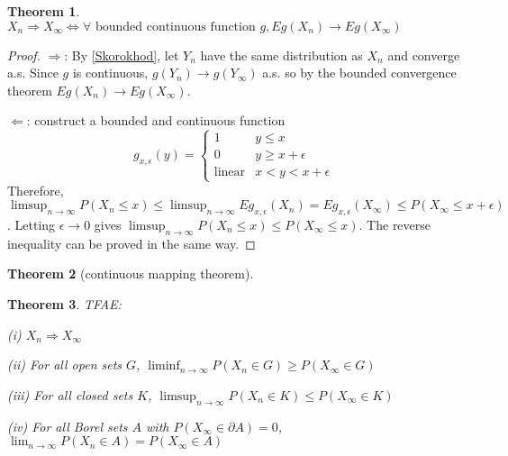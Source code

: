 \documentclass{article}
\newtheorem{Thm}{Theorem}[section]
\theoremstyle{definition}
\begin{document}
\begin{Thm}
$X_n\Longrightarrow X_\infty\Longleftrightarrow\forall\text{ bounded continuous function }g, Eg(X_n)\longrightarrow Eg(X_\infty)$
\end{Thm}
\begin{proof}
$\Longrightarrow$: By \ref{Skorokhod}, let $Y_n$ have the same distribution as $X_n$ and converge a.s. Since $g$ is continuous, $g(Y_n)\longrightarrow g(Y_\infty)$ a.s. so by the bounded convergence theorem $Eg(X_n)\longrightarrow Eg(X_\infty)$.\par
$\Longleftarrow$: construct a bounded and continuous function\[g_{x,\epsilon}(y)=\left\{\begin{matrix}
 1 &y\le x \\
 0 & y\ge x+\epsilon\\
 \text{linear} & x< y< x+\epsilon
\end{matrix}\right.\]
Therefore, $\limsup_{n\to\infty} P(X_n\le x)\le \limsup_{n\to\infty} Eg_{x,\epsilon}(X_n)=Eg_{x,\epsilon}(X_\infty)\le P(X_\infty\le x+\epsilon)$. Letting $\epsilon\to 0$ gives $\limsup_{n\to\infty}P(X_n\le x)\le P(X_\infty\le x)$. The reverse inequality can be proved in the same way.
\end{proof}
\begin{Thm}[continuous mapping theorem]

\end{Thm}

\begin{Thm}
TFAE:\par
(i) $X_n\Longrightarrow X_\infty$\par
(ii) For all open sets $G$, $\liminf_{n\to\infty}P(X_n\in G)\ge P(X_\infty\in G)$\par
(iii) For all closed sets $K$, $\limsup_{n\to\infty}P(X_n\in K)\le P(X_\infty\in K)$\par
(iv) For all Borel sets $A$ with $P(X_\infty\in\partial A)=0$, $\lim_{n\to\infty}P(X_n\in A)=P(X_\infty\in A)$
\end{Thm}
\end{document}
